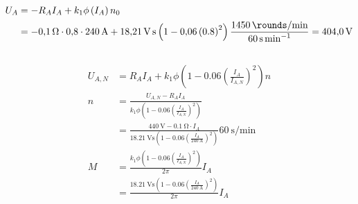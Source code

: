 \documentclass[11pt,a4paper]{scrartcl}
\newcommand{\mybr}[1]{\left(#1\right)}
\newcommand{\0}{_{\mybr{0}}}
\newcommand{\1}{_{\mybr{1}}}
\newcommand{\2}{_{\mybr{2}}}
\begin{document}
\section{}
\subsection{}
\begin{align}
U_A&=-R_A I_A+k_1\phi\mybr{I_A}n_0\\
&=\SI{-0.1}{\ohm}\cdot\num{0.8}\cdot\SI{240}{\ampere}+\SI{18.21}{\volt\second}\mybr{1-\num{0.06}\mybr{0.8}^2}\frac{\SI{1450}{\rounds\per\minute}}{\SI{60}{\second\per\minute}}=\SI{404.0}{\volt}
\end{align}

\subsection{}
\begin{align}
U_{A,N}&=R_A I_A+k_1\phi\mybr{1-\num{0.06}\mybr{\frac{I_A}{I_{A,N}}}^2}n\\
n&=\frac{U_{A,N}-R_A I_A}{k_1\phi\mybr{1-\num{0.06}\mybr{\frac{I_A}{I_{A,N}}}^2}}\\
&=\frac{\SI{440}{\volt}-\SI{0.1}{\ohm}\cdot I_A}{\SI{18.21}{\volt\second}\mybr{1-\num{0.06}\mybr{\frac{I_A}{\SI{240}{\ampere}}}^2}}\SI{60}{\second\per\minute}\\
M&=\frac{k_1\phi\mybr{1-\num{0.06}\mybr{\frac{I_A}{I_{A,N}}}^2}}{2\pi}I_A\\
&=\frac{\SI{18.21}{\volt\second}\mybr{1-\num{0.06}\mybr{\frac{I_A}{\SI{240}{\ampere}}}^2}}{2\pi}I_A
\end{align}
\begin{figure*}[!hp]
	\centering
\end{figure*}
\end{document}

